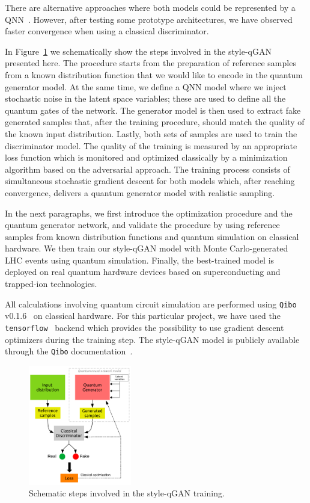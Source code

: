 \documentclass[twocolumn,preprintnumbers,superscriptaddress]{revtex4-2}
\begin{document}
%
There are alternative approaches where both models could be represented by a
QNN~\cite{dallaire2018quantum, hu2019quantum, benedetti2019adversarial, romero2021variational, niu2021entangling}. However, after testing some prototype architectures, we have observed faster convergence when using a classical discriminator.

In Figure~\ref{fig:scheme} we schematically show the steps involved in the style-qGAN
presented here. The procedure starts from the preparation of reference samples from a
known distribution function that we would like to encode in the quantum
generator model. At the same time, we define a QNN model where
we inject stochastic noise in the latent space variables; these are used to
define all the quantum gates of the network. The generator model is then used to extract fake generated samples
that, after the training procedure, should match the quality of the known input
distribution. Lastly, both sets of samples are used to train the discriminator
model. The quality of the training is measured by an appropriate loss function
which is monitored and optimized classically by a minimization algorithm based on
the adversarial approach. The training process consists of simultaneous
stochastic gradient descent for both models which, after reaching convergence,
delivers a quantum generator model with realistic sampling.

In the next paragraphs, we first introduce the optimization procedure and the quantum
generator network, and validate the procedure by using reference samples from known
distribution functions and quantum simulation on classical hardware. We then
train our style-qGAN model with Monte Carlo-generated LHC events using quantum
simulation. Finally, the best-trained model is deployed on real quantum hardware
devices based on superconducting and trapped-ion technologies.

All calculations involving quantum circuit simulation are performed using
{\tt Qibo} v0.1.6~\cite{efthymiou2020qibo,stavros_efthymiou_2021_5088103} on
classical hardware. For this particular project, we have used the {\tt
tensorflow}~\cite{tensorflow2015-whitepaper} backend which provides the
possibility to use gradient descent optimizers during the training step. The
style-qGAN model is publicly available through the {\tt Qibo}
documentation~\cite{qGAN_github_model}.

\begin{figure}
  \includegraphics[width=0.4\textwidth]{plots/scheme2.pdf}
  \caption{\label{fig:scheme} Schematic steps involved in the style-qGAN training.}
\end{figure}
\end{document}
